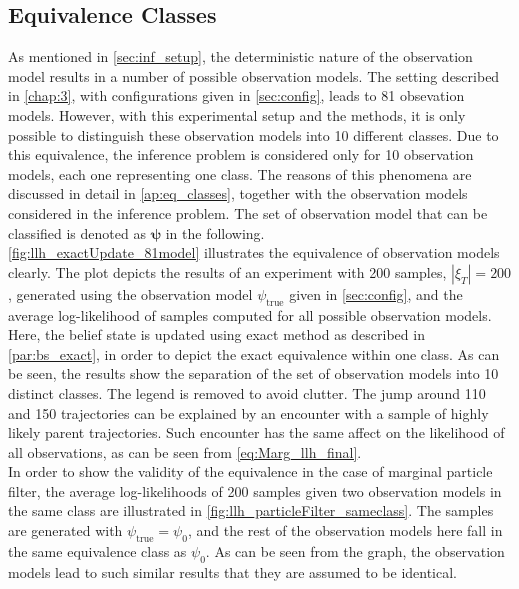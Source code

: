 \subsection{Equivalence Classes}
\label{sec:eq_classes}
As mentioned in \cref{sec:inf_setup}, the deterministic nature of the observation model results in a number of possible observation models. The setting described in \cref{chap:3}, with configurations given in \cref{sec:config}, leads to 81 obsevation models. However, with this experimental setup and the methods, it is only possible to distinguish these observation models into 10 different classes. Due to this equivalence, the inference problem is considered only for 10 observation models, each one representing one class. The reasons of this phenomena are discussed in detail in \cref{ap:eq_classes}, together with the observation models considered in the inference problem. The set of observation model that can be classified is denoted as $ \symbf{\psi} $ in the following. \\
\autoref{fig:llh_exactUpdate_81model} illustrates the equivalence of observation models clearly. The plot depicts the results of an experiment with 200 samples, $ |\xi_T| = 200 $, generated using the observation model $ \psi_{\text{true}} $ given in \cref{sec:config}, and the average log-likelihood of samples computed for all possible observation models. Here, the belief state is updated using exact method as described in \cref{par:bs_exact}, in order to depict the exact equivalence within one class. As can be seen, the results show the separation of the set of observation models into 10 distinct classes. The legend is removed to avoid clutter. The jump around 110 and 150 trajectories can be explained by an encounter with a sample of highly likely parent trajectories. Such encounter has the same affect on the likelihood of all observations, as can be seen from \autoref{eq:Marg_llh_final}.\\
In order to show the validity of the equivalence in the case of marginal particle filter, the average log-likelihoods of 200 samples given two observation models in the same class are illustrated in \autoref{fig:llh_particleFilter_sameclass}. The samples are generated with $ \psi_{\text{true}} = \psi_{0} $, and the rest of the observation models here fall in the same equivalence class as $ \psi_0 $. As can be seen from the graph, the observation models lead to such similar results that they are assumed to be identical. 
